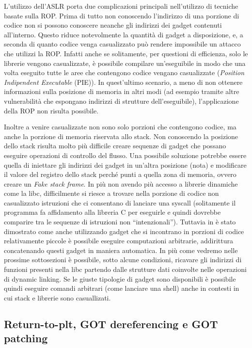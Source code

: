 L'utilizzo dell'ASLR porta due complicazioni principali nell'utilizzo
di tecniche basate sulla ROP. Prima di tutto non conoscendo
l'indirizzo di una porzione di codice non si possono conoscere neanche
gli indirizzi dei gadget contenuti all'interno. Questo riduce
notevolmente la quantità di gadget a disposizione, e, a seconda di
quanto codice venga casualizzato può rendere impossibile un attacco
che utilizzi la ROP. Infatti anche se solitamente, per questioni di
efficienza, solo le librerie vengono casualizzate, è possibile
compilare un'eseguibile in modo che una volta eseguito tutte le aree
che contengono codice vengano casualizzate (\emph{Position Indipendent
  Executable} (PIE)). In quest'ultimo scenario, a meno di non ottenere
informazioni sulla posizione di memoria in altri modi (ad esempio
tramite altre vulnerabilità che espongano indirizzi di strutture
dell'eseguibile), l'applicazione della ROP non risulta possibile.

Inoltre a venire casualizzate non sono solo porzioni che contengono
codice, ma anche la porzione di memoria riservata allo stack. Non
conoscendo la posizione dello stack risulta molto più difficile creare
sequenze di gadget che possano eseguire operazioni di controllo del
flusso. Una possibile soluzione potrebbe essere quella di iniettare
gli indirizzi dei gadget in un'altra posizione (nota) e modificare il
valore del registro dello stack perché punti a quella zona di memoria,
ovvero creare un \emph{Fake stack frame}. In più non avendo più
accesso a librerie dinamiche come la libc, difficilmente si riesce a
trovare nella porzione di codice non casualizzato istruzioni che ci
consentano di lanciare una syscall (solitamente il programma fa
affidamento alla libreria C per eseguirle e quindi dovrebbe comparire
tra le sequenze di istruzioni non ``intenzionali''). Tuttavia in
\cite{schwartz-2011} è stato dimostrato come anche utilizzando gadget che si
incontrano in porzioni di codice relativamente piccole è possibile
eseguire computazioni arbitrarie, addirittura concatenando questi
gadget in maniera automatica. In più come vedremo nelle prossime
sottosezioni è possibile, sotto alcune condizioni, ricavare gli
indirizzi di funzioni presenti nella libc partendo dalle strutture
dati coinvolte nelle operazioni di dynamic linking. Se le giuste
tipologie di gadget sono disponibili è possibile quindi eseguire
comandi arbitrari (come lanciare una shell) anche in contesti in cui
stack e librerie sono casuallizati.


\subsection{Return-to-plt, GOT dereferencing e GOT patching}
\label{sec:expl}

